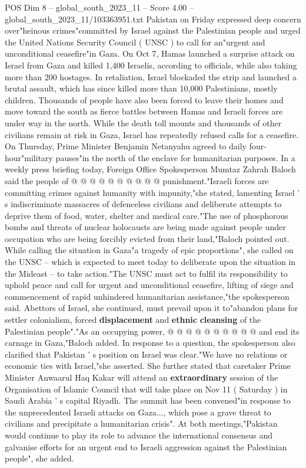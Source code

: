 \begin{textsample}{POS Dim 8 – global\_south\_2023\_11 – Score 4.00 – global\_south\_2023\_11/103363951.txt}  \label{ex:f8_pos_365}
Pakistan on Friday expressed deep concern over"heinous crimes"committed by Israel against the Palestinian people and urged the United Nations Security Council ( UNSC ) to call for an"urgent and unconditional ceasefire"in Gaza.
On Oct 7, Hamas launched a surprise attack on Israel from Gaza and killed 1,400 Israelis, according to officials, while also taking more than 200 hostages.
In retaliation, Israel blockaded the strip and launched a brutal assault, which has since killed more than 10,000 Palestinians, mostly children.
Thousands of people have also been forced to leave their homes and move toward the south as fierce battles between Hamas and Israeli forces are under way in the north.
While the death toll mounts and thousands of other civilians remain at risk in Gaza, Israel has repeatedly refused calls for a ceasefire.
On Thursday, Prime Minister Benjamin Netanyahu agreed to daily four-hour"military pauses"in the north of the enclave for humanitarian purposes.
In a weekly press briefing today, Foreign Office Spokesperson Mumtaz Zahrah Baloch said the people of @ @ @ @ @ @ @ @ @ @ punishment."Israeli forces are committing crimes against humanity with impunity,"she stated, lamenting Israel ' s indiscriminate massacres of defenceless civilians and deliberate attempts to deprive them of food, water, shelter and medical care."The use of phosphorous bombs and threats of nuclear holocausts are being made against people under occupation who are being forcibly evicted from their land,"Baloch pointed out.
While calling the situation in Gaza"a tragedy of epic proportions", she called on the UNSC -- which is expected to meet today to deliberate upon the situation in the Mideast -- to take action."The UNSC must act to fulfil its responsibility to uphold peace and call for urgent and unconditional ceasefire, lifting of siege and commencement of rapid unhindered humanitarian assistance,"the spokesperson said.
Abettors of Israel, she continued, must prevail upon it to"abandon plans for settler colonialism, forced \textbf{displacement} and \textbf{ethnic} \textbf{cleansing} of the Palestinian people"."As an occupying power, @ @ @ @ @ @ @ @ @ @ and end its carnage in Gaza,"Baloch added.
In response to a question, the spokesperson also clarified that Pakistan ' s position on Israel was clear."We have no relations or economic ties with Israel,"she asserted.
She further stated that caretaker Prime Minister Anwaarul Haq Kakar will attend an \textbf{extraordinary} session of the Organisation of Islamic Council that will take place on Nov 11 ( Saturday ) in Saudi Arabia ' s capital Riyadh.
The summit has been convened"in response to the unprecedented Israeli attacks on Gaza..., which pose a grave threat to civilians and precipitate a humanitarian crisis".
At both meetings,"Pakistan would continue to play its role to advance the international consensus and galvanise efforts for an urgent end to Israeli aggression against the Palestinian people", she added.

\end{textsample}
